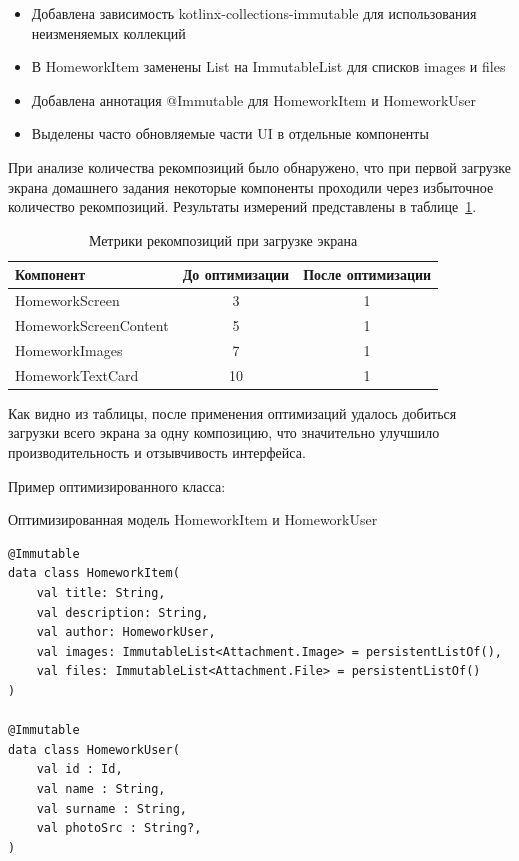 \documentclass[14pt, russian]{scrartcl}
\begin{document}
\begin{itemize}
\item Добавлена зависимость kotlinx-collections-immutable для использования неизменяемых коллекций
\item В HomeworkItem заменены List на ImmutableList для списков images и files
\item Добавлена аннотация @Immutable для HomeworkItem и HomeworkUser
\item Выделены часто обновляемые части UI в отдельные компоненты
\end{itemize}

При анализе количества рекомпозиций было обнаружено, что при первой загрузке экрана домашнего задания некоторые компоненты проходили через избыточное количество рекомпозиций. Результаты измерений представлены в таблице~\ref{tab:recomposition-metrics}.

\begin{table}[!htb]
\caption{Метрики рекомпозиций при загрузке экрана}
\vspace{-0.3cm}
\label{tab:recomposition-metrics}
\begin{center}
\begin{tabular}{|l|c|c|}
\hline
\textbf{Компонент} & \textbf{До оптимизации} & \textbf{После оптимизации} \\
\hline
HomeworkScreen & 3 & 1 \\
\hline
HomeworkScreenContent & 5 & 1 \\
\hline
HomeworkImages & 7 & 1 \\
\hline
HomeworkTextCard & 10 & 1 \\
\hline
\end{tabular}
\end{center}
\end{table}

Как видно из таблицы, после применения оптимизаций удалось добиться загрузки всего экрана за одну композицию, что значительно улучшило производительность и отзывчивость интерфейса.

Пример оптимизированного класса:

\begin{listing}[!htb]
\caption{Оптимизированная модель HomeworkItem и HomeworkUser}
\vspace{-0.3cm}
\label{lst:optimized-homework}
\begin{verbatim}
@Immutable
data class HomeworkItem(
    val title: String,
    val description: String,
    val author: HomeworkUser,
    val images: ImmutableList<Attachment.Image> = persistentListOf(),
    val files: ImmutableList<Attachment.File> = persistentListOf()
)

@Immutable
data class HomeworkUser(
    val id : Id,
    val name : String,
    val surname : String,
    val photoSrc : String?,
)
\end{verbatim}
\end{listing}
\end{document}
